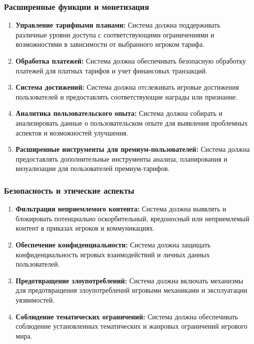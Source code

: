 \subsubsection{Расширенные функции и монетизация}

\begin{enumerate}[label=FR\arabic*., resume]
    \item \textbf{Управление тарифными планами:} Система должна поддерживать различные уровни доступа с соответствующими ограничениями и возможностями в зависимости от выбранного игроком тарифа.

    \item \textbf{Обработка платежей:} Система должна обеспечивать безопасную обработку платежей для платных тарифов и учет финансовых транзакций.

    \item \textbf{Система достижений:} Система должна отслеживать игровые достижения пользователей и предоставлять соответствующие награды или признание.

    \item \textbf{Аналитика пользовательского опыта:} Система должна собирать и анализировать данные о пользовательском опыте для выявления проблемных аспектов и возможностей улучшения.

    \item \textbf{Расширенные инструменты для премиум-пользователей:} Система должна предоставлять дополнительные инструменты анализа, планирования и визуализации для пользователей премиум-тарифов.
\end{enumerate}

\subsubsection{Безопасность и этические аспекты}

\begin{enumerate}[label=FR\arabic*., resume]
    \item \textbf{Фильтрация неприемлемого контента:} Система должна выявлять и блокировать потенциально оскорбительный, вредоносный или неприемлемый контент в приказах игроков и коммуникациях.

    \item \textbf{Обеспечение конфиденциальности:} Система должна защищать конфиденциальность игровых взаимодействий и личных данных пользователей.

    \item \textbf{Предотвращение злоупотреблений:} Система должна включать механизмы для предотвращения злоупотреблений игровыми механиками и эксплуатации уязвимостей.

    \item \textbf{Соблюдение тематических ограничений:} Система должна обеспечивать соблюдение установленных тематических и жанровых ограничений игрового мира.
\end{enumerate}

